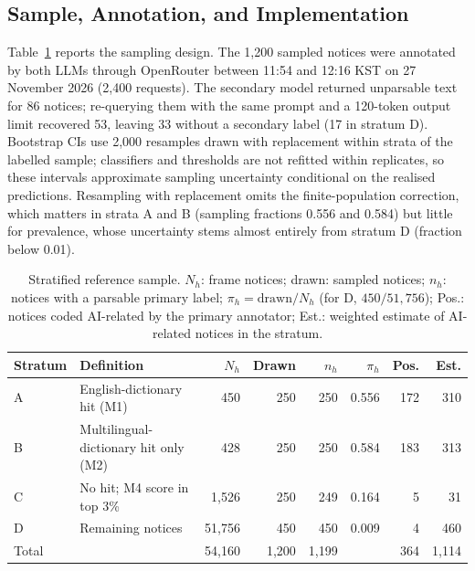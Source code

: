 \documentclass[runningheads]{llncs}
\begin{document}
\subsection{Sample, Annotation, and Implementation}
Table~\ref{tab:design} reports the sampling design. The 1,200 sampled notices were annotated by both LLMs through OpenRouter between 11:54 and 12:16 KST on 27 November 2026 (2,400 requests). The secondary model returned unparsable text for 86 notices; re-querying them with the same prompt and a 120-token output limit recovered 53, leaving 33 without a secondary label (17 in stratum D). Bootstrap CIs use 2,000 resamples drawn with replacement within strata of the labelled sample; classifiers and thresholds are not refitted within replicates, so these intervals approximate sampling uncertainty conditional on the realised predictions. Resampling with replacement omits the finite-population correction, which matters in strata A and B (sampling fractions 0.556 and 0.584) but little for prevalence, whose uncertainty stems almost entirely from stratum D (fraction below 0.01).

\begin{table}[t]
\caption{Stratified reference sample. $N_h$: frame notices; drawn: sampled notices; $n_h$: notices with a parsable primary label; $\pi_h=\mathrm{drawn}/N_h$ (for D, $450/51{,}756$); Pos.: notices coded AI-related by the primary annotator; Est.: weighted estimate of AI-related notices in the stratum.}\label{tab:design}
\centering
\begin{tabular}{llrrrrrr}
\toprule
Stratum & Definition & $N_h$ & Drawn & $n_h$ & $\pi_h$ & Pos. & Est. \\
\midrule
A & English-dictionary hit (M1) & 450 & 250 & 250 & 0.556 & 172 & 310 \\
B & Multilingual-dictionary hit only (M2) & 428 & 250 & 250 & 0.584 & 183 & 313 \\
C & No hit; M4 score in top 3\% & 1,526 & 250 & 249 & 0.164 & 5 & 31 \\
D & Remaining notices & 51,756 & 450 & 450 & 0.009 & 4 & 460 \\
\midrule
Total & & 54,160 & 1,200 & 1,199 & & 364 & 1,114 \\
\bottomrule
\end{tabular}
\end{table}
\end{document}
